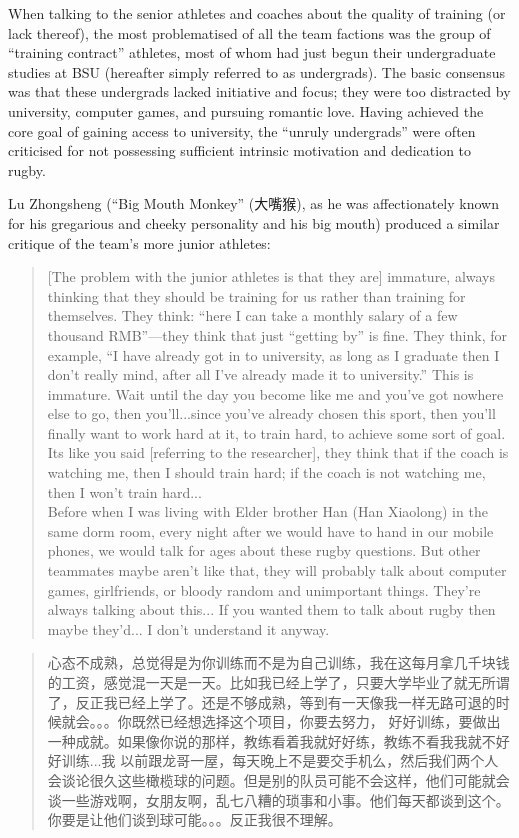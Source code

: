 \begin{CJK}{UTF8}{gbsn}
When talking to the senior athletes and coaches about the quality of training (or lack thereof), the most problematised of all the team factions was the group of ``training contract'' athletes, most of whom had just begun their undergraduate studies at BSU (hereafter simply referred to as undergrads).  The basic consensus was that these undergrads lacked initiative and focus; they were too distracted by university, computer games, and pursuing romantic love. Having achieved the core goal of gaining access to university, the ``unruly undergrads'' were often criticised for not possessing sufficient intrinsic motivation and dedication to rugby.

Lu Zhongsheng (``Big Mouth Monkey'' (大嘴猴), as he was affectionately known for his gregarious and cheeky personality and his big mouth) produced a similar critique of the team's more junior athletes:

      \begin{quote}
        [The problem with the junior athletes is that they are] immature, always thinking that they should be training for us rather than training for themselves.  They think: ``here I can take a monthly salary of a few thousand RMB''---they think that just ``getting by'' is fine.  They think, for example,  ``I have already got in to university, as long as I graduate then I don't really mind, after all I've already made it to university.''  This is immature.  Wait until the day you become like me and you've got nowhere else to go, then you'll...since you've already chosen this sport, then you'll finally want to work hard at it, to train hard, to achieve some sort of goal.  Its like you said [referring to the researcher], they think that if the coach is watching me, then I should train hard; if the coach is not watching me, then I won't train hard...\\

        Before when I was living with Elder brother Han (Han Xiaolong) in the same dorm room, every night after we would have to hand in our mobile phones, we would talk for ages about these rugby questions. But other teammates maybe aren't like that, they will probably talk about computer games, girlfriends, or bloody random and unimportant things.  They're always talking about this... If you wanted them to talk about rugby then maybe they'd... I don't understand it anyway.
      \end{quote}

      \begin{quote}
        心态不成熟，总觉得是为你训练而不是为自己训练，我在这每月拿几千块钱的工资，感觉混一天是一天。比如我已经上学了，只要大学毕业了就无所谓了，反正我已经上学了。还是不够成熟，等到有一天像我一样无路可退的时候就会。。。你既然已经想选择这个项目，你要去努力， 好好训练，要做出一种成就。如果像你说的那样，教练看着我就好好练，教练不看我我就不好好训练...我
    以前跟龙哥一屋，每天晚上不是要交手机么，然后我们两个人会谈论很久这些橄榄球的问题。但是别的队员可能不会这样，他们可能就会谈一些游戏啊，女朋友啊，乱七八糟的琐事和小事。他们每天都谈到这个。你要是让他们谈到球可能。。。反正我很不理解。
      \end{quote}


\end{CJK}
